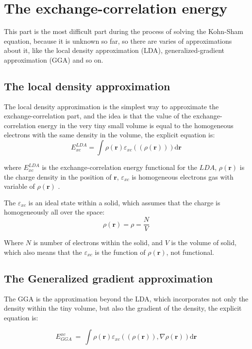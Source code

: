 \documentclass[a4paper, 12pt, titlepage,oneside,drop]{kthesis}
\begin{document}
\section{The exchange-correlation energy}
\noindent This part is the most difficult part during the process of solving the Kohn-Sham equation, because it is unknown so far, so there
 are varies of approximations about it, like the local density approximation (LDA), generalized-gradient approximation (GGA) and
so on.
\subsection{The local density approximation}
\noindent The local density approximation is the simplest way to approximate the exchange-correlation part, and the idea is that the value 
of the exchange-correlation energy in the very tiny small volume is equal to the homogeneous electrons with the same density in 
the volume, the explicit equation is: 
\begin{equation}
 E^\textit{LDA}_\textit{xc} = \int \rho(\textbf{r}) \varepsilon_\textit{xc}( (\rho(\textbf{r})) ) \mathrm{d} \textbf{r} 
\end{equation}

\noindent where $ E^\textit{LDA}_\textit{xc} $ is the exchange-correlation energy functional for the $LDA$, $\rho(\textbf{r})$ is the charge density in the position of $\textbf{r}$, $\varepsilon_\textit{xc}$ is homogeneous 
electrons gas with variable of  $\rho(\textbf{r})$ .

\noindent The $\varepsilon_\textit{xc}$ is an ideal state within a solid, which assumes that the charge is homogeneously all over the space:
\begin{equation}
 \rho(\textbf{r}) = \rho = \frac{N}{V}
\end{equation}

\noindent Where $N$ is number of electrons within the solid, and $V$ is the volume of solid, which also means that the $\varepsilon_\textit{xc}$ is the function of $\rho(\textbf{r})$,
 not functional. 
\subsection{The Generalized gradient approximation}
\noindent The GGA is the approximation beyond the LDA, which incorporates not only the density within the tiny volume, but also the gradient
 of the density, the explicit equation is:

\begin{equation}
E_{\textit{GGA}}^{\textit{xc}}\ = \ \int \rho(\textbf{r}) \varepsilon_\textit{xc}( (\rho(\textbf{r})), \nabla \rho(\textbf{r}) ) \mathrm{d} \textbf{r} 
\end{equation}
\end{document}
